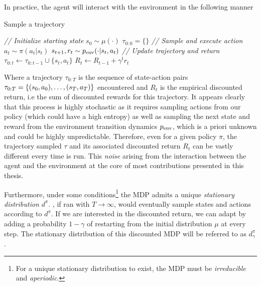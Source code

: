 In practice, the agent will interact with the environment in the following manner

\begin{center}
\begin{minipage}{0.9\textwidth}
\begin{algorithm}[H]
\caption{Sample a trajectory}
\label{alg:sample_traj}
\begin{algorithmic}[1]
\STATE \textit{// Initialize starting state}
\STATE $s_0 \sim \mu(\cdot)$
\STATE $\tau_{0:0} = \{ \}$
\STATE \textit{// Sample and execute action}
\STATE $a_t \sim \pi(a_t|s_t)$
\STATE $s_{t+1}, r_t \sim p_{\text{env}}(\cdot | s_t, a_t)$
\STATE \textit{// Update trajectory and return}
\STATE $\tau_{0:t} \leftarrow \tau_{0:t-1} \cup \{s_t, a_t\}$
\STATE $R_t \leftarrow R_{t-1} + \gamma^t r_t$
\ENDFOR
\end{algorithmic}
\end{algorithm}
\end{minipage}
\end{center}
\vspace{1em}

Where a trajectory $\tau_{0:T}$ is the sequence of state-action pairs $\tau_{0:T}=\{(s_0,a_0), \ldots,(s_T, a_T) \}$ encountered and $R_t$ is the empirical discounted return, i.e the sum of discounted rewards for this trajectory. It appears clearly that this process is highly stochastic as it requires sampling actions from our policy (which could have a high entropy) as well as sampling the next state and reward from the environment transition dynamics $p_{\text{env}}$, which is a priori unknown and could be highly unpredictable. Therefore, even for a given policy $\pi$, the trajectory sampled $\tau$ and its associated discounted return $R_t$ can be vastly different every time  is run. This \emph{noise} arising from the interaction between the agent and the environment at the core of most contributions presented in this thesis.

Furthermore, under some conditions\footnote{For a unique stationary distribution to exist, the MDP must be \emph{irreducible} and \emph{aperiodic}.} the MDP admits a unique \emph{stationary distribution} $d^\pi$. , if ran with $T\to\infty$, would eventually sample states and actions according to $d^\pi$. If we are interested in the discounted return, we can adapt  by adding a probability $1-\gamma$ of restarting from the initial distribution $\mu$ at every step. The stationary distribution of this discounted MDP will be referred to as $d^\pi_\gamma$.

